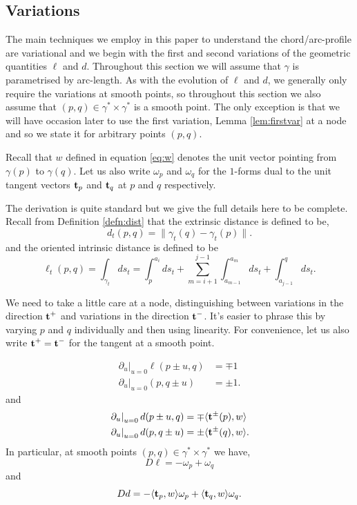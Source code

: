 \documentclass[12pt]{amsart}
\begin{document}
\subsection{Variations}
\label{sec:orgheadline8}

The main techniques we employ in this paper to understand the chord/arc-profile are variational and we begin with the first and second variations of the geometric quantities \(\ell\) and \(d\). Throughout this section we will assume that \(\gamma\) is parametrised by arc-length. As with the evolution of \(\ell\) and \(d\), we generally only require the variations at smooth points, so throughout this section we also assume that \((p,q) \in \gamma^{\ast} \times \gamma^{\ast}\) is a smooth point. The only exception is that we will have occasion later to use the first variation, Lemma \ref{lem:firstvar} at a node and so we state it for arbitrary points \((p,q)\).

Recall that \(w\) defined in equation \eqref{eq:w} denotes the unit vector pointing from \(\gamma(p)\) to \(\gamma(q)\). Let us also write $\omega_p$ and $\omega_q$ for the $1$-forms dual to the unit tangent vectors $\operatorname{\mathbf{t}}_p$ and $\operatorname{\mathbf{t}}_q$ at $p$ and $q$ respectively.

The derivation is quite standard but we give the full details here to be complete. Recall from Definition \ref{defn:dist} that the extrinsic distance is defined to be,
\[
d_t(p, q) = \|\gamma_t(q) - \gamma_t(p)\|.
\]
and the oriented intrinsic distance is defined to be
\[
\ell_t(p, q) = \int_{\gamma_t} ds_t = \int_p^{a_i} ds_t + \sum_{m=i+1}^{j-1} \int_{a_{m-1}}^{a_m} ds_t + \int_{a_{j-1}}^q ds_t.
\]

We need to take a little care at a node, distinguishing between variations in the direction \(\operatorname{\mathbf{t}}^+\) and variations in the direction \(\operatorname{\mathbf{t}}^-\). It's easier to phrase this by varying \(p\) and \(q\) individually and then using linearity. For convenience, let us also write \(\operatorname{\mathbf{t}}^+ = \operatorname{\mathbf{t}}^-\) for the tangent at a smooth point.

\begin{lemma}
\label{lem:firstvar}
\[
\begin{split}
\left.\partial_u\right|_{u=0} \ell (p \pm u, q)  &= \mp 1 \\
\left.\partial_u\right|_{u=0} (p, q \pm u) &= \pm 1.
\end{split}
\]
and
\[
\begin{split}
\left.\partial_u\right|_{u=0} d (p \pm u, q) &= \mp \langle{\operatorname{\mathbf{t}}^{\pm}(p)},{w}\rangle \\
\left.\partial_u\right|_{u=0} d (p, q \pm u) &= \pm \langle{\operatorname{\mathbf{t}}^{\pm}(q)},{w}\rangle.
\end{split}
\]
In particular, at smooth points \((p,q) \in \gamma^{\ast} \times \gamma^{\ast}\) we have,
\[
D\ell = -\omega_p + \omega_q
\]
and
\[
D d = -\langle{\operatorname{\mathbf{t}}_p},{w}\rangle \omega_p + \langle{\operatorname{\mathbf{t}}_q},{w}\rangle \omega_q.
\]
\end{lemma}
\end{document}
